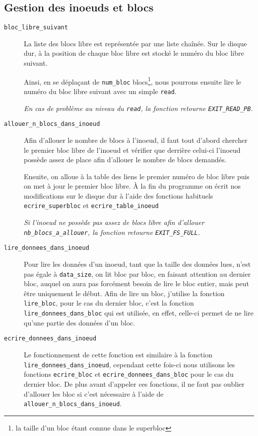 \documentclass[a4paper, 11pt]{article}
\begin{document}
		\subsection{Gestion des inoeuds et blocs}
		\begin{description}
			\item[\texttt{bloc\_libre\_suivant}] La liste des blocs libre est représentée par une liste chaînée. Sur le disque dur, à la position de chaque bloc
				libre est stocké le numéro du bloc libre suivant.

				Ainsi, en se déplaçant de \texttt{num\_bloc} blocs\footnote{la taille d'un bloc étant connue dans le superbloc}, 
				nous pourrons ensuite lire le numéro du bloc libre suivant avec un simple \texttt{read}. 
				
				\textit{En cas de problème au niveau du \texttt{read}, la fonction retourne \texttt{EXIT\_READ\_PB}.}
			\item[\texttt{allouer\_n\_blocs\_dans\_inoeud}] Afin d'allouer le nombre de blocs à l'inoeud, il faut tout d'abord chercher le premier bloc libre de
				l'inoeud et vérifier que derrière celui-ci l'inoeud possède assez de place afin d'allouer le nombre de blocs demandés.

				Ensuite, on alloue à la table des liens le premier numéro de bloc libre puis on met à jour le premier bloc libre. À la fin du programme on écrit
				nos modifications sur le disque dur à l'aide des fonctions habituels \texttt{ecrire\_superbloc} et \texttt{ecrire\_table\_inoeud}
				
				\textit{Si l'inoeud ne possède pas assez de blocs libre afin d'allouer \texttt{nb\_blocs\_a\_allouer}, la fonction retourne \texttt{EXIT\_FS\_FULL}.}
			\item[\texttt{lire\_donnees\_dans\_inoeud}] Pour lire les données d'un inoeud, tant que la taille des données lues, n'est pas égale à
				\texttt{data\_size}, on lit bloc par bloc, en faisant attention au dernier bloc, auquel on aura pas forcément besoin de lire le bloc entier, mais
				peut être uniquement le début. Afin de lire un bloc, j'utilise la fonction \texttt{lire\_bloc}, pour le cas du dernier bloc, c'est la fonction
				\texttt{lire\_donnees\_dans\_bloc} qui est utilisée, en effet, celle-ci permet de ne lire qu'une partie des données d'un bloc.
			\item[\texttt{ecrire\_donnees\_dans\_inoeud}] Le fonctionnement de cette fonction est similaire à la fonction \texttt{lire\_donnees\_dans\_inoeud},
				cependant cette fois-ci nous utilisons les fonctions \texttt{ecrire\_bloc} et \texttt{ecrire\_donnees\_dans\_bloc} pour le cas du dernier bloc.
				De plus avant d'appeler ces fonctions, il ne faut pas oublier d'allouer les bloc si c'est nécessaire à l'aide de \texttt{allouer\_n\_blocs\_dans\_inoeud}.


\end{description}
\end{document}
